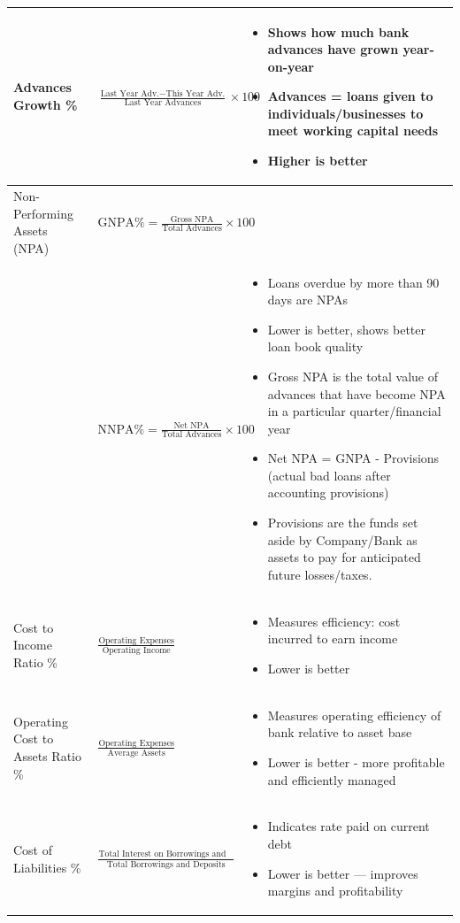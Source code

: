 \documentclass[12pt]{article}
\begin{document}
\begin{longtable}{|>{\raggedright\arraybackslash}m{4.5cm}|>{\raggedright\arraybackslash}m{5cm}|>{\raggedright\arraybackslash}m{6cm}|}
Advances Growth \% & 
$\frac{\text{Last Year Adv.} - \text{This Year Adv.}}{\text{Last Year Advances}} \times 100$ &
\begin{itemize}
\item Shows how much bank advances have grown year-on-year
\item Advances = loans given to individuals/businesses to meet working capital needs
\item Higher is better
\end{itemize} \\
\hline

Non-Performing Assets (NPA) & 
$\text{GNPA\%} = \frac{\text{Gross NPA}}{\text{Total Advances}} \times 100$ \\
& 
$\text{NNPA\%} = \frac{\text{Net NPA}}{\text{Total Advances}} \times 100$ &
\begin{itemize}
\item Loans overdue by more than 90 days are NPAs
\item Lower is better, shows better loan book quality
\item Gross NPA is the total value of advances that have become NPA in a particular quarter/financial year
\item Net NPA = GNPA - Provisions (actual bad loans after accounting provisions)
\item Provisions are the funds set aside by Company/Bank as assets to pay for anticipated future losses/taxes.
\end{itemize} \\
\hline

Cost to Income Ratio \% & 
$\frac{\text{Operating Expenses}}{\text{Operating Income}}$ &
\begin{itemize}
\item Measures efficiency: cost incurred to earn income
\item Lower is better
\end{itemize} \\
\hline

Operating Cost to Assets Ratio \% & 
$\frac{\text{Operating Expenses}}{\text{Average Assets}}$ &
\begin{itemize}
\item Measures operating efficiency of bank relative to asset base
\item Lower is better - more profitable and efficiently managed
\end{itemize} \\
\hline

Cost of Liabilities \% & 
$\frac{\text{Total Interest on Borrowings and Deposits}}{\text{Total Borrowings and Deposits}}$ &
\begin{itemize}
\item Indicates rate paid on current debt
\item Lower is better — improves margins and profitability
\end{itemize} \\
\hline


\end{longtable}
\end{document}
